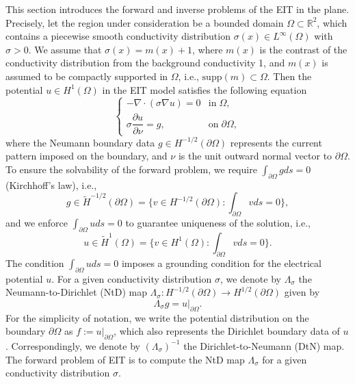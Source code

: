 \documentclass[11pt]{article}
\newcommand{\R}{{\mathbb R}}
\newcommand{\pa}{\partial}
\newcommand{\wit}{\widetilde}
\begin{document}
This section introduces the forward and inverse problems of the EIT in the plane. Precisely, let the region under consideration be a bounded domain $\Omega\subset\R^2$, which contains a piecewise smooth conductivity distribution $ \sigma(x)\in L^\infty(\Omega) $ with $ \sigma>0 $. 
We assume that $\sigma(x) = m(x) + 1 $, where $m(x)$ is the contrast of the conductivity distribution from the background conductivity 1, and $m(x)$ is assumed to be compactly supported in $ \Omega $, i.e., $ \mathrm{supp}(m)\subset \Omega$. 
Then the potential $ u\in H^1(\Omega) $ in the EIT model satisfies the following equation \cite{BL02}
\begin{equation}\label{21}
\left\{ \begin{array}{ll}
-\nabla\cdot (\sigma\nabla u) = 0 & \text{in}\; \Omega,\\
\sigma\dfrac{\pa u}{\pa \nu} = g, & \text{on}\; \pa \Omega,
\end{array} \right.
\end{equation}
where the Neumann boundary data $ g\in H^{-1/2}(\pa \Omega) $ represents the current pattern imposed on the boundary, and $\nu$ is the unit outward normal vector to $ \pa \Omega $.
To ensure the solvability of the forward problem, we require $ \int_{\pa \Omega}gds = 0 $ (Kirchhoff's law), i.e.,
\begin{equation}\label{22}
g\in \wit{H}^{-1/2}(\pa \Omega) = \{v\in H^{-1/2}(\pa \Omega): \int_{\pa \Omega}vds = 0\},
\end{equation}
and we enforce $ \int_{\pa \Omega}uds = 0 $ to guarantee uniqueness of the solution, i.e.,
\begin{equation}\label{23}
u\in \wit{H}^1(\Omega) = \{v\in H^1(\Omega): \int_{\pa \Omega}vds = 0\}.
\end{equation}
The condition $ \int_{\pa \Omega}uds = 0 $ imposes a grounding condition for the electrical potential $ u $.
For a given conductivity distribution $ \sigma $, we denote by $ \Lambda_\sigma $ the Neumann-to-Dirichlet (NtD) map $ \Lambda_\sigma: H^{-1/2}(\pa \Omega)\to H^{1/2}(\pa \Omega) $ given by
\begin{equation}\label{24}
\Lambda_\sigma g = u|_{\pa \Omega}.
\end{equation}
For the simplicity of notation, we write the potential distribution on the boundary $\partial \Omega$ as $f:=u|_{\partial \Omega}$, which also represents the Dirichlet boundary data of $u$. Correspondingly, we denote by $ (\Lambda_\sigma)^{-1} $ the Dirichlet-to-Neumann (DtN) map. The forward problem of EIT is to compute the NtD map $ \Lambda_\sigma $ for a given conductivity distribution $ \sigma $.
\end{document}
